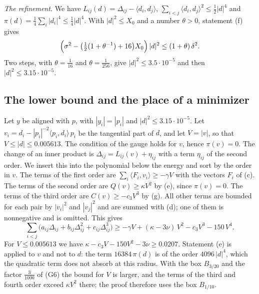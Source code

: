 \documentclass[reqno,a4paper,11pt]{amsart}
\numberwithin{equation}{section}
\begin{document}
\emph{The refinement.} We have $L_{ij}(d) = \Delta_{ij} - \langle d_i, d_j \rangle$, $\sum_{i<j} \langle d_i, d_j \rangle^2 \leq \tfrac12 |d|^4$ and $\pi(d) = \tfrac14 \sum_i |d_i|^4 \leq \tfrac14 |d|^4$. With $|d|^2 \leq X_0$ and a number $\theta > 0$, statement (f) gives
$$
\Bigl( \sigma^2 - \bigl( \tfrac12 (1 + \theta^{-1}) + 16 \bigr) X_0 \Bigr) \, |d|^2 \leq (1 + \theta) \, \delta^2 .
$$
Two steps, with $\theta = \tfrac{1}{16}$ and $\theta = \tfrac{1}{256}$, give $|d|^2 \leq 3.5 \cdot 10^{-5}$ and then $|d|^2 \leq 3.15 \cdot 10^{-5}$.

\subsection{The lower bound and the place of a minimizer}

Let $y$ be aligned with $p$, with $|y_i| = |p_i|$ and $|d|^2 \leq 3.15 \cdot 10^{-5}$. Let $v_i = d_i - |p_i|^{-2} \langle p_i, d_i \rangle \, p_i$ be the tangential part of $d$, and let $V = |v|$, so that $V \leq |d| \leq 0.005613$. The condition of the gauge holds for $v$, hence $\pi(v) = 0$. The change of an inner product is $\Delta_{ij} = L_{ij}(v) + \eta_{ij}$ with a term $\eta_{ij}$ of the second order. We insert this into the polynomial below the energy and sort by the order in $v$. The terms of the first order are $\sum_i \langle F_i, v_i \rangle \geq - \gamma V$ with the vectors $F_i$ of (c). The terms of the second order are $Q(v) \geq \kappa V^2$ by (e), since $\pi(v) = 0$. The terms of the third order are $C(v) \geq - c_3 V^3$ by (g). All other terms are bounded for each pair by $|v_i|^2$ and $|v_j|^2$ and are summed with (d); one of them is nonnegative and is omitted. This gives
$$
\sum_{i<j} \bigl( a_{ij} \Delta_{ij} + b_{ij} \Delta_{ij}^2 + c_{ij} \Delta_{ij}^3 \bigr) \geq - \gamma V + (\kappa - 3 \nu) \, V^2 - c_3 V^3 - 150 \, V^4 .
$$
For $V \leq 0.005613$ we have $\kappa - c_3 V - 150 V^2 - 3\nu \geq 0.0207$. Statement (e) is applied to $v$ and not to $d$: the term $16384 \, \pi(d)$ is of the order $4096 \, |d|^4$, which the quadratic term does not absorb at this radius. With the box $B_{3/20}$ and the factor $\tfrac{3}{1000}$ of (G6) the bound for $V$ is larger, and the terms of the third and fourth order exceed $\kappa V^2$ there; the proof therefore uses the box $B_{1/10}$.
\end{document}
